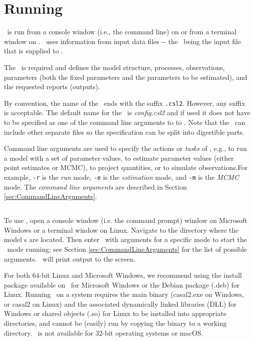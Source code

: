 \section{Running \CNAME\label{sec:RunningCasal2}}

\CNAME\ is run from a console window (i.e., the command line) on  or from a terminal window on . \CNAME\ uses information from input data files -{}- the \emph{\config{}}\ being the input file that is supplied to \CNAME.

The \config\ is required and defines the model structure, processes, observations, parameters (both the fixed parameters and the parameters to be estimated), and the requested reports (outputs).

By convention, the name of the \config\ ends with the suffix \texttt{.csl2}. However, any suffix is acceptable. The default name for the \config\ is \emph{config.csl2} and if used it does not have to be specified as one of the command line arguments to to \CNAME. Note that the \config\ can include other separate files so the specification can be split into digestible parts.

Command line arguments are used to specify the actions or \emph{tasks} of \CNAME, e.g., to run a model with a set of parameter values, to estimate parameter values (either point estimates or MCMC), to project quantities, or to simulate observations.For example, \texttt{-r} is the \emph{run} mode, \texttt{-e} is the \emph{estimation} mode, and \texttt{-m} is the \emph{MCMC} mode. The \emph{command line arguments} are described in Section \ref{sec:CommandLineArguments}.

\subsection{}

To use \CNAME, open a console window (i.e. the command prompt) window on Microsoft Windows or a terminal window on Linux. Navigate to the directory where the model \config s are located. Then enter \CNAME\ with arguments for a specific mode to start the \CNAME\ mode running; see Section \ref{sec:CommandLineArguments} for the list of possible arguments. \CNAME\ will print output to the screen.

For both 64-bit Linux and Microsoft Windows, we recommend using the install package available on \github\ for Microsoft Windows or the Debian package (.deb) for Linux. Running \CNAME\ on a system requires the main binary (casal2.exe on Windows, or casal2 on Linux) and the associated dynamically linked libraries (DLL) for Windows or shared objects (.so) for Linux to be installed into appropriate directories, and cannot be (easily) run by copying the binary to a working directory. \CNAME\ is not available for 32-bit operating systems or macOS.

